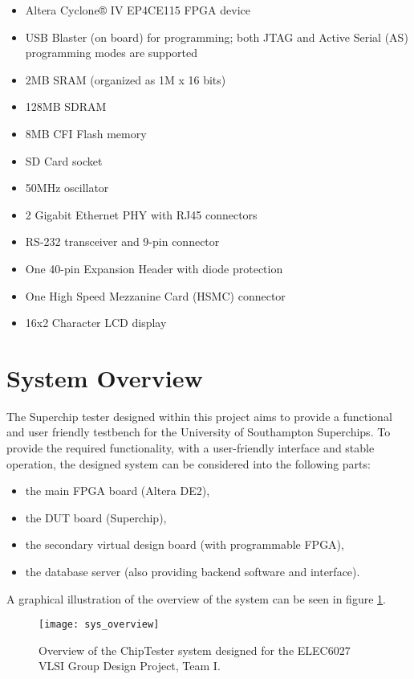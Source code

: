 \begin{itemize}
 \item Altera Cyclone® IV EP4CE115 FPGA device
 \item USB Blaster (on board) for programming; both JTAG and Active Serial (AS) programming modes are supported
 \item 2MB SRAM (organized as 1M x 16 bits)
 \item 128MB SDRAM
 \item 8MB CFI Flash memory
 \item SD Card socket
 \item 50MHz oscillator
 \item 2 Gigabit Ethernet PHY with RJ45 connectors
 \item RS-232 transceiver and 9-pin connector
 \item One 40-pin Expansion Header with diode protection
 \item One High Speed Mezzanine Card (HSMC) connector
 \item 16x2 Character LCD display
\end{itemize}




\section{System Overview}

The Superchip tester designed within this project aims to provide a functional and user friendly testbench for the University of Southampton Superchips. To provide the required functionality, with a user-friendly interface and stable operation, the designed system can be considered into the following parts:

\begin{itemize}
 \item the main FPGA board (Altera DE2),
 \item the DUT board (Superchip),
 \item the secondary virtual design board (with programmable FPGA),
 \item the database server (also providing backend software and interface).
\end{itemize}

A graphical illustration of the overview of the system can be seen in figure \ref{fig:intro_sys_overview}.

\begin{figure}[h!]
\centering
\texttt{[image: sys\_overview]}
\caption{Overview of the ChipTester system designed for the ELEC6027 VLSI Group Design Project, Team I.}
\label{fig:intro_sys_overview}
\end{figure}


